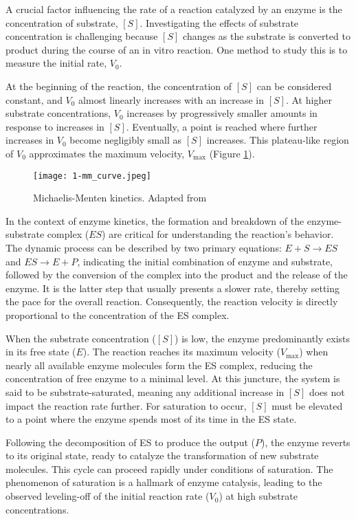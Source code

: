 A crucial factor influencing the rate of a reaction catalyzed by an enzyme is the concentration of substrate, \([S]\). Investigating the effects of substrate concentration is challenging because \([S]\) changes as the substrate is converted to product during the course of an in vitro reaction. One method to study this is to measure the initial rate, \(V_0\).

At the beginning of the reaction, the concentration of \([S]\) can be considered constant, and \(V_0\) almost linearly increases with an increase in \([S]\). At higher substrate concentrations, \(V_0\) increases by progressively smaller amounts in response to increases in \([S]\). Eventually, a point is reached where further increases in \(V_0\) become negligibly small as \([S]\) increases. This plateau-like region of \(V_0\) approximates the maximum velocity, \(V_{\max}\) (Figure \ref{fig:mm_curve}).

\begin{figure}
  \centering
  \texttt{[image: 1-mm\_curve.jpeg]}
  \caption{Michaelis-Menten kinetics. Adapted from \citeauthor{lehninger}}
  \label{fig:mm_curve}
\end{figure}

In the context of enzyme kinetics, the formation and breakdown of the enzyme-substrate complex ($ES$) are critical for understanding the reaction's behavior. The dynamic process can be described by two primary equations: \(E + S \rightarrow ES\) and \(ES \rightarrow E + P\), indicating the initial combination of enzyme and substrate, followed by the conversion of the complex into the product and the release of the enzyme. It is the latter step that usually presents a slower rate, thereby setting the pace for the overall reaction. Consequently, the reaction velocity is directly proportional to the concentration of the ES complex.

When the substrate concentration (\([S]\)) is low, the enzyme predominantly exists in its free state (\(E\)). The reaction reaches its maximum velocity (\(V_{\text{max}}\)) when nearly all available enzyme molecules form the ES complex, reducing the concentration of free enzyme to a minimal level. At this juncture, the system is said to be substrate-saturated, meaning any additional increase in \([S]\) does not impact the reaction rate further. For saturation to occur, \([S]\) must be elevated to a point where the enzyme spends most of its time in the ES state.

Following the decomposition of ES to produce the output (\(P\)), the enzyme reverts to its original state, ready to catalyze the transformation of new substrate molecules. This cycle can proceed rapidly under conditions of saturation. The phenomenon of saturation is a hallmark of enzyme catalysis, leading to the observed leveling-off of the initial reaction rate (\(V_0\)) at high substrate concentrations.

